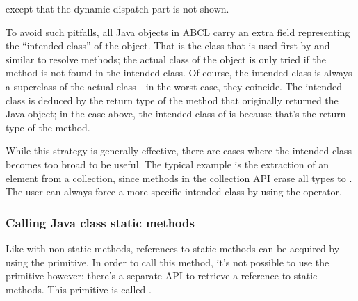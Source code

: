 \documentclass[10pt]{book}
\begin{document}
except that the dynamic dispatch part is not shown.

To avoid such pitfalls, all Java objects in ABCL carry an extra
field representing the ``intended class'' of the object. That is the class
that is used first by  and similar to resolve methods;
the actual class of the object is only tried if the method is not found
in the intended class. Of course, the intended class is always a superclass
of the actual class - in the worst case, they coincide. The intended class
is deduced by the return type of the method that originally returned
the Java object; in the case above, the intended class of 
is  because that's the return type of
the  method.

While this strategy is generally effective, there are cases where the
intended class becomes too broad to be useful. The typical example
is the extraction of an element from a collection, since methods in
the collection API erase all types to . The user can
always force a more specific intended class by using the 
operator.


\subsubsection{Calling Java class static methods}

Like with non-static methods, references to static methods can be acquired
by using the  primitive. In order to call this method,
it's not possible to use the  primitive however: there's a 
separate API to retrieve a reference to static methods. This
primitive is called . 
\end{document}
